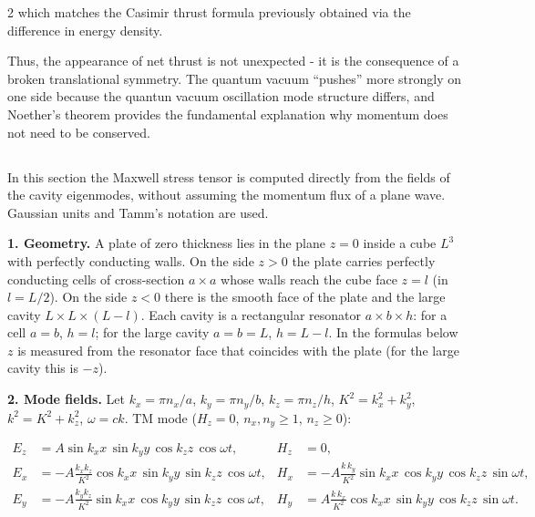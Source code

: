 \documentclass[twoside, 10pt]{article}
\def\myvspacebeforesubsection{-2.0mm}
\def\myvspaceaftersubsection{-2.5mm}
\begin{document}
\begin{multicols}{2}
which matches the Casimir thrust formula previously obtained via the difference in energy density.

Thus, the appearance of net thrust is not unexpected - it is the consequence of a broken translational symmetry.
The quantum vacuum “pushes” more strongly on one side because the quantun vacuum oscillation mode structure differs,
and Noether’s theorem provides the fundamental explanation why momentum does not need to be conserved.



\vspace{\myvspacebeforesubsection}
\subsection*{}
\vspace{\myvspaceaftersubsection}

In this section the Maxwell stress tensor is computed directly from the fields of
the cavity eigenmodes, without assuming the momentum flux of a plane wave.
Gaussian units and Tamm's notation are used.

\textbf{1. Geometry.} A plate of zero thickness lies in the plane $z=0$ inside a cube
$L^3$ with perfectly conducting walls. On the side $z>0$ the plate carries perfectly
conducting cells of cross-section $a\times a$ whose walls reach the cube face $z=l$
(in \cite{Drozdov2024} $l=L/2$). On the side $z<0$ there is the smooth face of the
plate and the large cavity $L\times L\times(L-l)$. Each cavity is a rectangular
resonator $a\times b\times h$: for a cell $a=b$, $h=l$; for the large cavity
$a=b=L$, $h=L-l$. In the formulas below $z$ is measured from the resonator face
that coincides with the plate (for the large cavity this is $-z$).

\textbf{2. Mode fields.} Let $k_x=\pi n_x/a$, $k_y=\pi n_y/b$, $k_z=\pi n_z/h$,
$K^2=k_x^2+k_y^2$, $k^2=K^2+k_z^2$, $\omega=ck$. TM mode ($H_z=0$,
$n_x,n_y\ge1$, $n_z\ge0$):
\end{multicols}
\[
\begin{aligned}
E_z&=A\sin k_xx\,\sin k_yy\,\cos k_zz\,\cos\omega t, &
H_z&=0,\\
E_x&=-A\frac{k_xk_z}{K^2}\cos k_xx\,\sin k_yy\,\sin k_zz\,\cos\omega t, &
H_x&=-A\frac{k\,k_y}{K^2}\sin k_xx\,\cos k_yy\,\cos k_zz\,\sin\omega t,\\
E_y&=-A\frac{k_yk_z}{K^2}\sin k_xx\,\cos k_yy\,\sin k_zz\,\cos\omega t, &
H_y&=A\frac{k\,k_x}{K^2}\cos k_xx\,\sin k_yy\,\cos k_zz\,\sin\omega t.
\end{aligned}
\]
\end{document}

